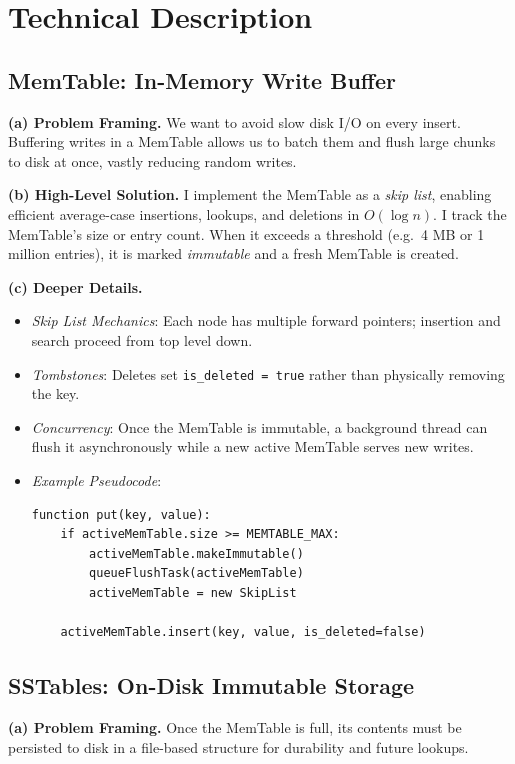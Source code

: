 \documentclass[10pt]{article}
\begin{document}
\section{Technical Description}

\subsection{MemTable: In-Memory Write Buffer}
\textbf{(a) Problem Framing.}  
We want to avoid slow disk I/O on every insert. Buffering writes in a MemTable allows us to batch them and flush large chunks to disk at once, vastly reducing random writes.

\textbf{(b) High-Level Solution.}  
I implement the MemTable as a \emph{skip list}, enabling efficient average-case insertions, lookups, and deletions in $O(\log n)$. I track the MemTable's size or entry count. When it exceeds a threshold (e.g.\ 4 MB or 1 million entries), it is marked \emph{immutable} and a fresh MemTable is created. 

\textbf{(c) Deeper Details.}  
\begin{itemize}
  \item \emph{Skip List Mechanics}: Each node has multiple forward pointers; insertion and search proceed from top level down.
  \item \emph{Tombstones}: Deletes set \texttt{is\_deleted = true} rather than physically removing the key.
  \item \emph{Concurrency}: Once the MemTable is immutable, a background thread can flush it asynchronously while a new active MemTable serves new writes.
  \item \emph{Example Pseudocode}:
\begin{verbatim}
function put(key, value):
    if activeMemTable.size >= MEMTABLE_MAX:
        activeMemTable.makeImmutable()
        queueFlushTask(activeMemTable)
        activeMemTable = new SkipList

    activeMemTable.insert(key, value, is_deleted=false)
\end{verbatim}
\end{itemize}

\subsection{SSTables: On-Disk Immutable Storage}
\textbf{(a) Problem Framing.}  
Once the MemTable is full, its contents must be persisted to disk in a file-based structure for durability and future lookups.
\end{document}
